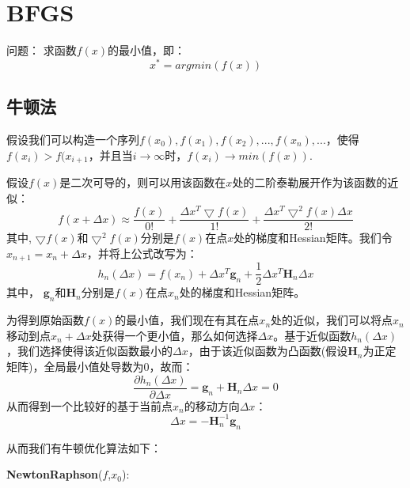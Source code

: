 
\chapter{BFGS}

问题： 求函数$f(x)$的最小值，即：
\begin{displaymath}
x^*=argmin(f(x))
\end{displaymath} 

\section{牛顿法}
假设我们可以构造一个序列$f(x_0), f(x_1), f(x_2), ..., f(x_n), ...$，使得$f(x_i)>f(x_{i+1}$，并且当$i \rightarrow \infty$时，$f(x_i) \rightarrow min(f(x))$.

假设$f(x)$是二次可导的，则可以用该函数在$x$处的二阶泰勒展开作为该函数的近似：
\begin{displaymath}
f(x+\Delta x) \approx \frac{f(x)}{0!} + \frac{\Delta x^T\bigtriangledown f(x)}{1!}+ \frac{\Delta x^T\bigtriangledown^2f(x)\Delta x}{2!} 
\end{displaymath}
其中, $\bigtriangledown f(x)$和$\bigtriangledown^2f(x)$分别是$f(x)$在点$x$处的梯度和Hessian矩阵。我们令$x_{n+1}=x_n+\Delta x$，并将上公式改写为：
\begin{displaymath}
h_n(\Delta x)=f(x_n)+\Delta x^T\mathbf{g}_n +\frac{1}{2}\Delta x^T \mathbf{H}_n\Delta x
\end{displaymath}
其中， $\mathbf{g}_n$和$\mathbf{H}_n$分别是$f(x)$在点$x_n$处的梯度和Hessian矩阵。

为得到原始函数$f(x)$的最小值，我们现在有其在点$x_n$处的近似，我们可以将点$x_n$移动到点$x_n + \Delta x$处获得一个更小值，那么如何选择$\Delta x$。基于近似函数$h_n(\Delta x)$，我们选择使得该近似函数最小的$\Delta x$，由于该近似函数为凸函数(假设$\mathbf{H}_n$为正定矩阵)，全局最小值处导数为0，故而：
\begin{displaymath}
\frac{\partial h_n(\Delta x)}{\partial \Delta x} = \mathbf{g}_n + \mathbf{H}_n \Delta x = 0
\end{displaymath}
从而得到一个比较好的基于当前点$x_n$的移动方向$\Delta x$：
\begin{displaymath}
\Delta x = -\mathbf{H}_n^{-1}\mathbf{g}_n
\end{displaymath}

从而我们有牛顿优化算法如下：

\begin{minipage}{0.8\textwidth}\centering
\begin{algorithm}[H]
\textbf{NewtonRaphson}($f$,$x_0$):\\
\end{algorithm}
\end{minipage}

